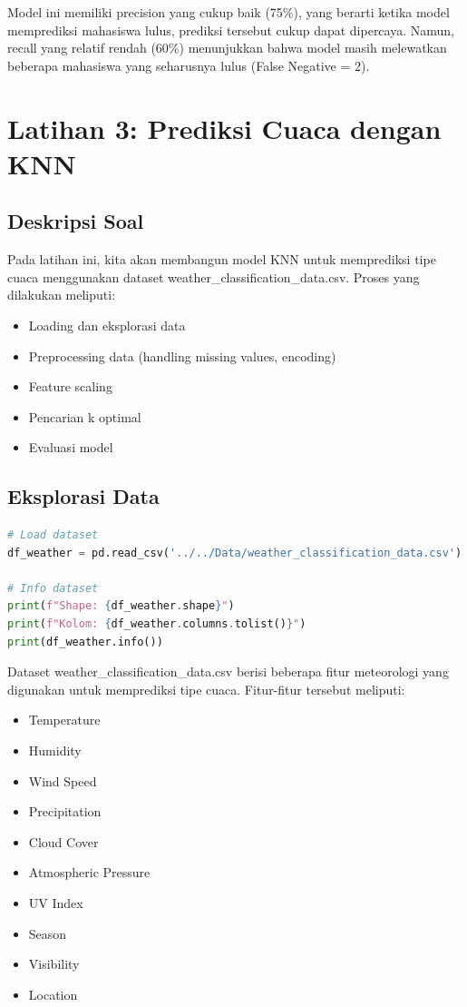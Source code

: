 \documentclass[12pt,a4paper]{article}
\begin{document}
Model ini memiliki precision yang cukup baik (75\%), yang berarti ketika model memprediksi mahasiswa lulus, prediksi tersebut cukup dapat dipercaya. Namun, recall yang relatif rendah (60\%) menunjukkan bahwa model masih melewatkan beberapa mahasiswa yang seharusnya lulus (False Negative = 2).

\section{Latihan 3: Prediksi Cuaca dengan KNN}

\subsection{Deskripsi Soal}
Pada latihan ini, kita akan membangun model KNN untuk memprediksi tipe cuaca menggunakan dataset weather\_classification\_data.csv. Proses yang dilakukan meliputi:
\begin{itemize}
    \item Loading dan eksplorasi data
    \item Preprocessing data (handling missing values, encoding)
    \item Feature scaling
    \item Pencarian k optimal
    \item Evaluasi model
\end{itemize}

\subsection{Eksplorasi Data}

\begin{lstlisting}[language=Python, caption=Load dan Eksplorasi Dataset]
# Load dataset
df_weather = pd.read_csv('../../Data/weather_classification_data.csv')

# Info dataset
print(f"Shape: {df_weather.shape}")
print(f"Kolom: {df_weather.columns.tolist()}")
print(df_weather.info())
\end{lstlisting}

Dataset weather\_classification\_data.csv berisi beberapa fitur meteorologi yang digunakan untuk memprediksi tipe cuaca. Fitur-fitur tersebut meliputi:
\begin{itemize}
    \item Temperature
    \item Humidity
    \item Wind Speed
    \item Precipitation
    \item Cloud Cover
    \item Atmospheric Pressure
    \item UV Index
    \item Season
    \item Visibility
    \item Location
\end{itemize}
\end{document}
